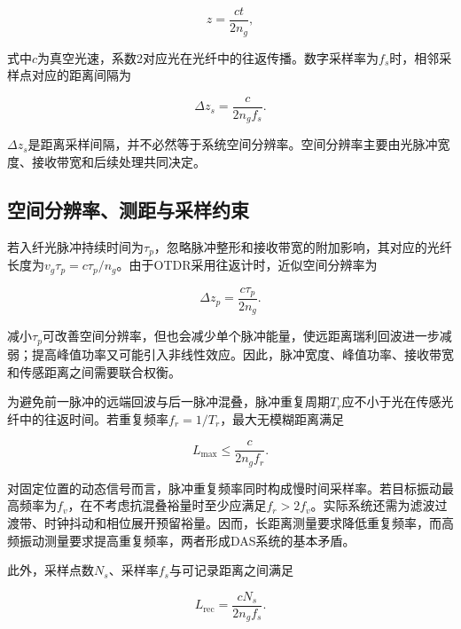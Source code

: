 \begin{equation}
z=\frac{ct}{2n_g},
\label{eq:distance_time}
\end{equation}

式中$c$为真空光速，系数2对应光在光纤中的往返传播。数字采样率为$f_s$时，相邻采样点对应的距离间隔为

\begin{equation}
\Delta z_s=\frac{c}{2n_g f_s}.
\label{eq:sample_spacing}
\end{equation}

$\Delta z_s$是距离采样间隔，并不必然等于系统空间分辨率。空间分辨率主要由光脉冲宽度、接收带宽和后续处理共同决定\cite{lu2010distributed,liokumovich2015fundamentals}。

\subsection{空间分辨率、测距与采样约束}

若入纤光脉冲持续时间为$\tau_p$，忽略脉冲整形和接收带宽的附加影响，其对应的光纤长度为$v_g\tau_p=c\tau_p/n_g$。由于OTDR采用往返计时，近似空间分辨率为

\begin{equation}
\Delta z_p=\frac{c\tau_p}{2n_g}.
\label{eq:spatial_resolution}
\end{equation}

减小$\tau_p$可改善空间分辨率，但也会减少单个脉冲能量，使远距离瑞利回波进一步减弱；提高峰值功率又可能引入非线性效应。因此，脉冲宽度、峰值功率、接收带宽和传感距离之间需要联合权衡\cite{martins2013modulation,ren2016extinction,wang2019pulsecoding}。

为避免前一脉冲的远端回波与后一脉冲混叠，脉冲重复周期$T_r$应不小于光在传感光纤中的往返时间。若重复频率$f_r=1/T_r$，最大无模糊距离满足

\begin{equation}
L_{\max}\leq\frac{c}{2n_g f_r}.
\label{eq:max_range}
\end{equation}

对固定位置的动态信号而言，脉冲重复频率同时构成慢时间采样率。若目标振动最高频率为$f_v$，在不考虑抗混叠裕量时至少应满足$f_r>2f_v$。实际系统还需为滤波过渡带、时钟抖动和相位展开预留裕量。因而，长距离测量要求降低重复频率，而高频振动测量要求提高重复频率，两者形成DAS系统的基本矛盾\cite{masoudi2016review,muanenda2018advances,rao2021recent}。

此外，采样点数$N_s$、采样率$f_s$与可记录距离之间满足

\begin{equation}
L_{\mathrm{rec}}=\frac{cN_s}{2n_g f_s}.
\label{eq:record_length}
\end{equation}

